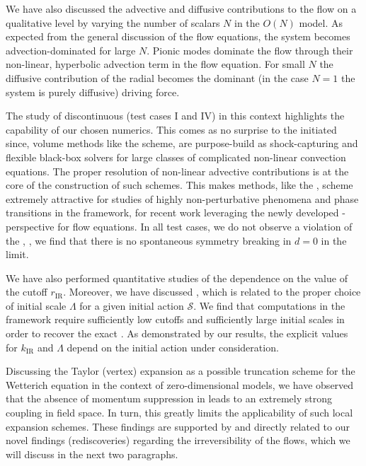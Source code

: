 We have also discussed the advective and diffusive contributions to the \frg{} flow on a qualitative level by varying the number of scalars $N$ in the $O(N)$ model.
As expected from the general discussion of the flow equations, the system becomes advection-dominated for large $N$.
Pionic modes dominate the flow through their non-linear, hyperbolic advection term in the flow equation.
For small $N$ the diffusive contribution of the radial \sigmaMode{} becomes the dominant (in the case $N = 1$ the system is purely diffusive) driving force.

The study of discontinuous \ics{} (test cases I and IV) in this context highlights the capability of our chosen numerics.
This comes as no surprise to the \cfd{} initiated since, \fv{} volume methods like the \kt{} scheme, are purpose-build as shock-capturing and flexible black-box solvers for large classes of complicated non-linear convection equations.
The proper resolution of non-linear advective contributions is at the core of the construction of such schemes.
This makes \fv{} methods, like the \kt{}, scheme extremely attractive for \frg{} studies of highly non-perturbative phenomena and phase transitions in the \frg{} framework, \cf{} \ccite{\frgCFDRefs} for recent work leveraging the newly developed \cfd{}-perspective for \frg{} flow equations.
In all test cases, we do not observe a violation of the \cmwhTheoremWithRefs{}, \ie{}, we find that there is no spontaneous symmetry breaking in $d = 0$ in the \ir{} limit.

We have also performed quantitative studies of the dependence on the value of the \ir{} cutoff $r_\mathrm{IR}$.
Moreover, we have discussed \rgcy{}, which is related to the proper choice of \uv{} initial scale $\Lambda$ for a given initial action $\mathcal{S}$.
We find that computations in the \frg{} framework require sufficiently low \ir{} cutoffs and sufficiently large \uv{} initial scales in order to recover the exact \nptFunctions{}.
As demonstrated by our results, the explicit values for $k_\mathrm{IR}$ and $\Lambda$ depend on the initial action under consideration.

Discussing the \frg{} Taylor (vertex) expansion as a possible truncation scheme for the Wetterich equation in the context of zero-dimensional models, we have observed that the absence of momentum suppression in \dzero{} leads to an extremely strong coupling in field space.
In turn, this greatly limits the applicability of such local expansion schemes.
These findings are supported by and directly related to our novel findings (rediscoveries) regarding the irreversibility of the \grg{} flows, which we will discuss in the next two paragraphs.


